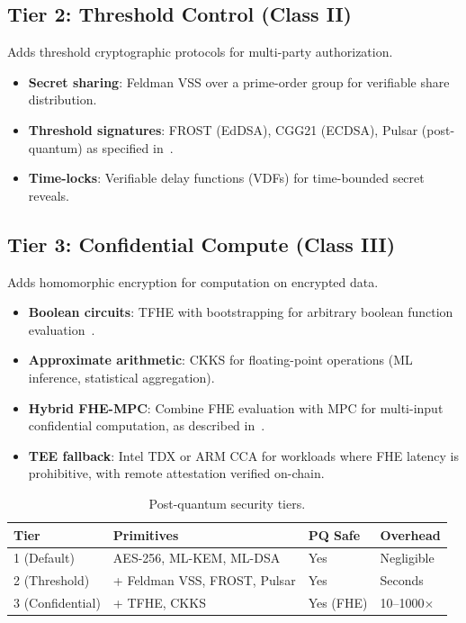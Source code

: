 \subsection{Tier 2: Threshold Control (Class II)}

Adds threshold cryptographic protocols for multi-party authorization.

\begin{itemize}[nosep]
  \item \textbf{Secret sharing}: Feldman VSS over a prime-order group for
        verifiable share distribution.
  \item \textbf{Threshold signatures}: FROST (EdDSA), CGG21 (ECDSA), Pulsar
        (post-quantum) as specified in~\cite{lux-mchain-mpc}.
  \item \textbf{Time-locks}: Verifiable delay functions (VDFs) for time-bounded
        secret reveals.
\end{itemize}

\subsection{Tier 3: Confidential Compute (Class III)}

Adds homomorphic encryption for computation on encrypted data.

\begin{itemize}[nosep]
  \item \textbf{Boolean circuits}: TFHE with bootstrapping for arbitrary boolean
        function evaluation~\cite{lux-tfhe}.
  \item \textbf{Approximate arithmetic}: CKKS for floating-point operations
        (ML inference, statistical aggregation).
  \item \textbf{Hybrid FHE-MPC}: Combine FHE evaluation with MPC for
        multi-input confidential computation, as described
        in~\cite{lux-fhe-mpc-hybrid}.
  \item \textbf{TEE fallback}: Intel TDX or ARM CCA for workloads where FHE
        latency is prohibitive, with remote attestation verified on-chain.
\end{itemize}

\begin{table}[H]
\centering
\caption{Post-quantum security tiers.}
\label{tab:pq}
\begin{tabular}{@{}llll@{}}
\toprule
\textbf{Tier} & \textbf{Primitives} & \textbf{PQ Safe} & \textbf{Overhead} \\
\midrule
1 (Default) & AES-256, ML-KEM, ML-DSA & Yes & Negligible \\
2 (Threshold) & + Feldman VSS, FROST, Pulsar & Yes & Seconds \\
3 (Confidential) & + TFHE, CKKS & Yes (FHE) & 10--1000$\times$ \\
\bottomrule
\end{tabular}
\end{table}

